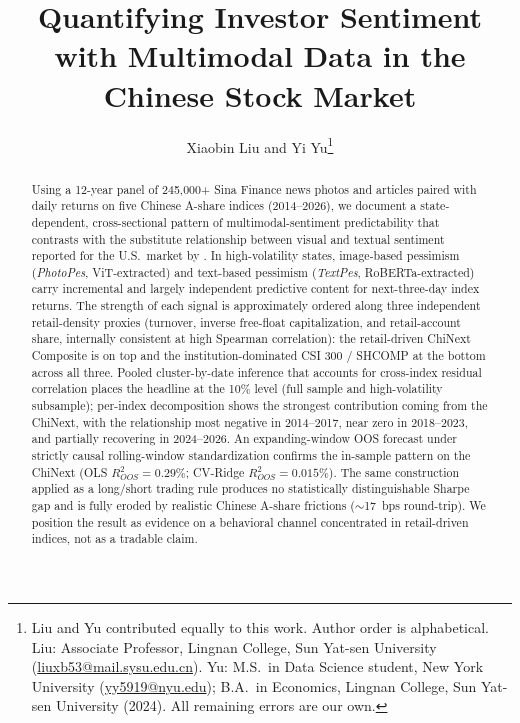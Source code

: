 \documentclass[AER]{AEA}
\begin{document}
\title{Quantifying Investor Sentiment with Multimodal Data in the Chinese Stock Market}
\author{Xiaobin Liu and Yi Yu\thanks{Liu and Yu contributed equally to this work. Author order is alphabetical. Liu: Associate Professor, Lingnan College, Sun Yat-sen University (\href{mailto:liuxb53@mail.sysu.edu.cn}{liuxb53@mail.sysu.edu.cn}). Yu: M.S.\ in Data Science student, New York University (\href{mailto:yy5919@nyu.edu}{yy5919@nyu.edu}); B.A.\ in Economics, Lingnan College, Sun Yat-sen University (2024). All remaining errors are our own.}}

\begin{abstract}
Using a 12-year panel of 245{,}000+ Sina Finance news photos and articles paired with daily returns on five Chinese A-share indices (2014--2026), we document a state-dependent, cross-sectional pattern of multimodal-sentiment predictability that contrasts with the substitute relationship between visual and textual sentiment reported for the U.S.\ market by \citet{obaid2022picture}. In high-volatility states, image-based pessimism (\textit{PhotoPes}, ViT-extracted) and text-based pessimism (\textit{TextPes}, RoBERTa-extracted) carry incremental and largely independent predictive content for next-three-day index returns. The strength of each signal is approximately ordered along three independent retail-density proxies (turnover, inverse free-float capitalization, and retail-account share, internally consistent at high Spearman correlation): the retail-driven ChiNext Composite is on top and the institution-dominated CSI 300 / SHCOMP at the bottom across all three. Pooled cluster-by-date inference that accounts for cross-index residual correlation places the headline at the 10\% level (full sample and high-volatility subsample); per-index decomposition shows the strongest contribution coming from the ChiNext, with the relationship most negative in 2014--2017, near zero in 2018--2023, and partially recovering in 2024--2026. An expanding-window OOS forecast under strictly causal rolling-window standardization confirms the in-sample pattern on the ChiNext (OLS $R^2_{OOS} = 0.29\%$; CV-Ridge $R^2_{OOS} = 0.015\%$). The same construction applied as a long/short trading rule produces no statistically distinguishable Sharpe gap and is fully eroded by realistic Chinese A-share frictions ($\sim$17~bps round-trip). We position the result as evidence on a behavioral channel concentrated in retail-driven indices, not as a tradable claim.
\end{abstract}
\end{document}
